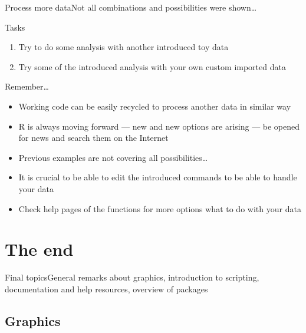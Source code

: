 \documentclass[compress, xelatex, 11pt, xcolor=svgnames, aspectratio=169,
	hyperref={
		bookmarks=true,
		unicode=true,
		colorlinks=true,
		pdftitle={Molecular data in R},
		plainpages=false,
		pdfauthor={Vojtech Zeisek},
		pdfsubject={Course about phylogeny and evolution in R},
		pdfcreator={XeLaTeX},
		pdfkeywords={R, evolution, phylogeny, molecular data},
		linkcolor=Crimson, %
		anchorcolor=Magenta, %
		citecolor=Magenta, %
		filecolor=Magenta, %
		menucolor=Magenta, %
		urlcolor=DodgerBlue, %
		},
	url={hyphens, lowtilde} %
	]{beamer}
\begin{document}
\begin{frame}{Process more data}{Not all combinations and possibilities were shown\ldots}
	\begin{exampleblock}{Tasks}
		\begin{enumerate}
			\item Try to do some analysis with another introduced toy data
			\item Try some of the introduced analysis with your own custom imported data
		\end{enumerate}
	\end{exampleblock}
	\begin{alertblock}{Remember\ldots}
		\begin{itemize}
			\item Working code can be easily recycled to process another data in similar way
			\item R is always moving forward --- new and new options are arising --- be opened for news and search them on the Internet
			\item Previous examples are not covering all possibilities\ldots
			\item It is crucial to be able to edit the introduced commands to be able to handle your data
			\item Check help pages of the functions for more options what to do with your data
		\end{itemize}
	\end{alertblock}
\end{frame}

\section{The end}

\begin{frame}{Final topics}{General remarks about graphics, introduction to scripting, documentation and help resources, overview of packages}
	\tableofcontents[currentsection, sectionstyle=show/hide, hideothersubsections]
\end{frame}

\subsection{Graphics}
\end{document}

